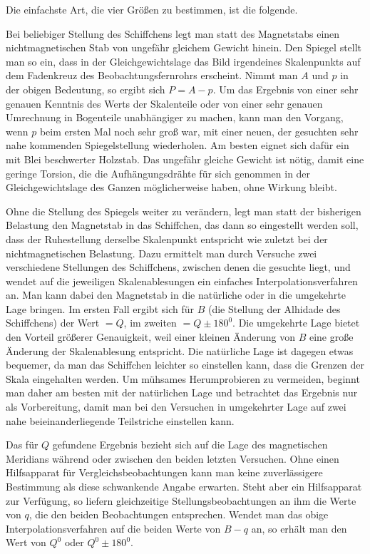 Die einfachste Art, die vier Größen zu bestimmen, ist die folgende.

Bei beliebiger Stellung des Schiffchens legt man statt des Magnetstabs einen nichtmagnetischen Stab von ungefähr gleichem Gewicht hinein. Den Spiegel stellt man so ein, dass in der Gleichgewichtslage das Bild irgendeines Skalenpunkts auf dem Fadenkreuz des Beobachtungsfernrohrs erscheint. Nimmt man $A$ und $p$ in der obigen Bedeutung, so ergibt sich $P=A-p$. Um das Ergebnis von einer sehr genauen Kenntnis des Werts der Skalenteile oder von einer sehr genauen Umrechnung in Bogenteile unabhängiger zu machen, kann man den Vorgang, wenn $p$ beim ersten Mal noch sehr groß war, mit einer neuen, der gesuchten sehr nahe kommenden Spiegelstellung wiederholen. Am besten eignet sich dafür ein mit Blei beschwerter Holzstab. Das ungefähr gleiche Gewicht ist nötig, damit eine geringe Torsion, die die Aufhängungsdrähte für sich genommen in der Gleichgewichtslage des Ganzen möglicherweise haben, ohne Wirkung bleibt.

Ohne die Stellung des Spiegels weiter zu verändern, legt man statt der bisherigen Belastung den Magnetstab in das Schiffchen, das dann so eingestellt
werden soll, dass der Ruhestellung derselbe Skalenpunkt entspricht wie zuletzt bei der nichtmagnetischen Belastung. Dazu ermittelt man durch Versuche zwei verschiedene Stellungen des Schiffchens, zwischen denen die gesuchte liegt, und wendet auf die jeweiligen Skalenablesungen ein einfaches Interpolationsverfahren an. Man kann dabei den Magnetstab in die natürliche oder in die umgekehrte Lage bringen. Im ersten Fall ergibt sich für $B$ (die Stellung der Alhidade des Schiffchens) der Wert $=Q$, im zweiten $=Q\pm180^0$. Die umgekehrte Lage bietet den Vorteil größerer Genauigkeit, weil einer kleinen Änderung von $B$ eine große Änderung der Skalenablesung entspricht. Die natürliche Lage ist dagegen etwas bequemer, da man das Schiffchen leichter so einstellen kann, dass die Grenzen der Skala eingehalten werden. Um mühsames Herumprobieren zu vermeiden, beginnt man daher am besten mit der natürlichen Lage und betrachtet das Ergebnis nur als Vorbereitung, damit man bei den Versuchen in umgekehrter Lage auf zwei nahe beieinanderliegende Teilstriche einstellen kann.

Das für $Q$ gefundene Ergebnis bezieht sich auf die Lage des magnetischen Meridians während oder zwischen den beiden letzten Versuchen. Ohne einen Hilfsapparat für Vergleichsbeobachtungen kann man keine zuverlässigere Bestimmung als diese schwankende Angabe erwarten. Steht aber ein Hilfsapparat zur Verfügung, so liefern gleichzeitige Stellungsbeobachtungen an ihm die Werte von $q$, die den beiden Beobachtungen entsprechen. Wendet man das obige Interpolationsverfahren auf die beiden Werte von $B-q$ an, so erhält man den Wert von $Q^0$ oder $Q^0\pm180^0$.

